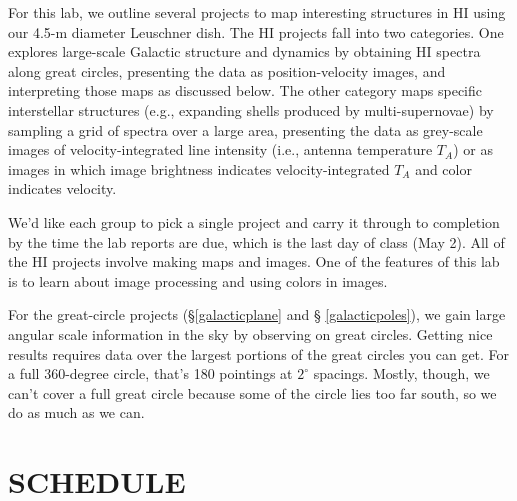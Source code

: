 \documentclass[psfig,preprint]{aastex}
\begin{document}
For this lab, we outline several projects to map interesting structures
in HI using our 4.5-m diameter Leuschner dish. The HI projects
fall into two categories. One explores large-scale Galactic structure
and dynamics by obtaining HI spectra along great circles, presenting the
data as position-velocity images, and interpreting those maps as
discussed below. The other category maps specific interstellar
structures (e.g., expanding shells produced by multi-supernovae) by
sampling a grid of spectra over a large area, presenting the data as
grey-scale images of velocity-integrated line intensity (i.e., antenna
temperature $T_A$) or as images in which image brightness indicates
velocity-integrated $T_A$ and color indicates velocity.

We'd like each group to pick a single project and carry it through to
completion by the time the lab reports are due, which is the last day of
class (May 2). All of the HI projects involve making maps and
images. One of the features of this lab is to learn about image
processing and using colors in images.

For the great-circle projects (\S \ref{galacticplane} and \S
\ref{galacticpoles}), we gain large angular scale information
in the sky by observing on great circles. Getting nice results
requires data over the largest portions of the great circles you can
get. For a full 360-degree circle, that's 180 pointings at $2^\circ$
spacings.  Mostly, though, we can't cover a full great circle because
some of the circle lies too far south, so we do as much as we can. 

\section{SCHEDULE}
\end{document}
